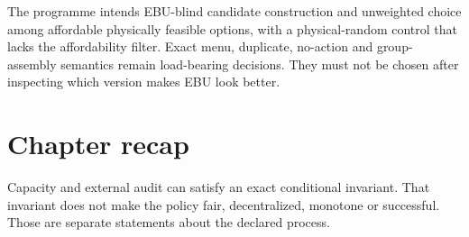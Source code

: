 The programme intends EBU-blind candidate construction and unweighted choice
among affordable physically feasible options, with a physical-random control
that lacks the affordability filter. Exact menu, duplicate, no-action and
group-assembly semantics remain load-bearing decisions. They must not be
chosen after inspecting which version makes EBU look better.

\section*{Chapter recap}
Capacity and external audit can satisfy an exact conditional invariant.
That invariant does not make the policy fair, decentralized, monotone or
successful. Those are separate statements about the declared process.
